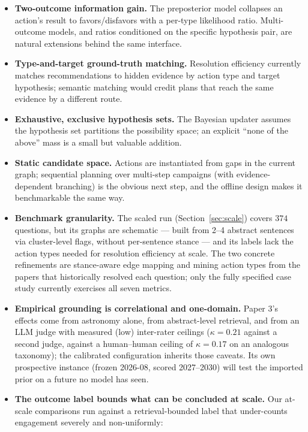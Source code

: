 \documentclass[11pt]{article}
\begin{document}
\begin{itemize}
  \item \textbf{Two-outcome information gain.} The preposterior model
  collapses an action's result to favors/disfavors with a per-type
  likelihood ratio. Multi-outcome models, and ratios conditioned on the
  specific hypothesis pair, are natural extensions behind the same
  interface.
  \item \textbf{Type-and-target ground-truth matching.} Resolution
  efficiency currently matches recommendations to hidden evidence by
  action type and target hypothesis; semantic matching would credit
  plans that reach the same evidence by a different route.
  \item \textbf{Exhaustive, exclusive hypothesis sets.} The Bayesian
  updater assumes the hypothesis set partitions the possibility space;
  an explicit ``none of the above'' mass is a small but valuable
  addition.
  \item \textbf{Static candidate space.} Actions are instantiated from
  gaps in the current graph; sequential planning over multi-step
  campaigns (with evidence-dependent branching) is the obvious next
  step, and the offline design makes it benchmarkable the same way.
  \item \textbf{Benchmark granularity.} The scaled run
  (Section~\ref{sec:scale}) covers $374$ questions, but its graphs are
  schematic --- built from 2--4 abstract sentences via cluster-level
  flags, without per-sentence stance --- and its labels lack the action
  types needed for resolution efficiency at scale. The two concrete
  refinements are stance-aware edge mapping and mining action types
  from the papers that historically resolved each question; only the
  fully specified case study currently exercises all seven metrics.
  \item \textbf{Empirical grounding is correlational and one-domain.}
  Paper 3's effects come from astronomy alone, from abstract-level
  retrieval, and from an LLM judge with measured (low) inter-rater
  ceilings ($\kappa = 0.21$ against a second judge, against a
  human--human ceiling of $\kappa = 0.17$ on an analogous taxonomy);
  the calibrated configuration inherits those caveats. Its own
  prospective instance (frozen 2026-08, scored 2027--2030) will test
  the imported prior on a future no model has seen.
  \item \textbf{The outcome label bounds what can be concluded at
  scale.} Our at-scale comparisons run against a retrieval-bounded
  label that under-counts engagement severely and non-uniformly:

\end{itemize}
\end{document}
